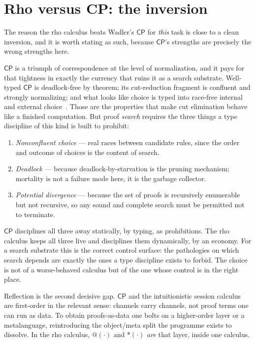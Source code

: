 \documentclass[11pt]{article}
\makeatletter
\theoremstyle{plain}
\theoremstyle{definition}
\theoremstyle{remark}
\newcommand{\CP}{\textsf{CP}}
\newcommand{\quoteP}[1]{@#1}
\newcommand{\drop}[1]{{*}#1}
\makeatother
\begin{document}
\section{Rho versus CP: the inversion}

The reason the rho calculus beats Wadler's $\CP$ for \emph{this} task is close
to a clean inversion, and it is worth stating as such, because $\CP$'s strengths
are precisely the wrong strengths here.

$\CP$ is a triumph of correspondence at the level of normalization, and it pays
for that tightness in exactly the currency that ruins it as a search substrate.
Well-typed $\CP$ is deadlock-free by theorem; its cut-reduction fragment is
confluent and strongly normalizing; and what looks like choice is typed into
race-free internal and external choice~\cite{wadler,cairespfenning}. Those are
the properties that make cut elimination behave like a finished computation. But
proof \emph{search} requires the three things a type discipline of this kind is
built to prohibit:
\begin{enumerate}[leftmargin=2.2em,itemsep=0.25em]
  \item \emph{Nonconfluent choice} --- real races between candidate rules, since
        the order and outcome of choices is the content of search.
  \item \emph{Deadlock} --- because deadlock-by-starvation is the pruning
        mechanism; mortality is not a failure mode here, it is the garbage
        collector.
  \item \emph{Potential divergence} --- because the set of proofs is recursively
        enumerable but not recursive, so any sound and complete search must be
        permitted not to terminate.
\end{enumerate}
$\CP$ disciplines all three away statically, by typing, as prohibitions. The rho
calculus keeps all three live and disciplines them dynamically, by an economy.
For a search substrate this is the correct control surface: the pathologies on
which search depends are exactly the ones a type discipline exists to forbid.
The choice is not of a worse-behaved calculus but of the one whose control is in
the right place.

Reflection is the second decisive gap. $\CP$ and the intuitionistic session
calculus are first-order in the relevant sense: channels carry channels, not
proof terms one can run as data. To obtain proofs-as-data one bolts on a
higher-order layer or a metalanguage, reintroducing the object/meta split the
programme exists to dissolve. In the rho calculus, $\quoteP{(\cdot)}$ and
$\drop{(\cdot)}$ \emph{are} that layer, inside one calculus.
\end{document}
